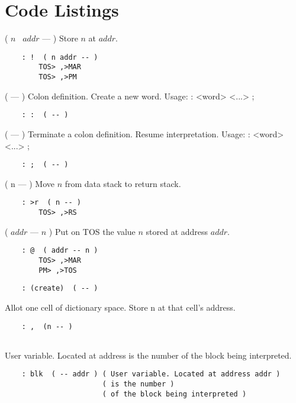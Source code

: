 \setchapterpreamble[u]{\margintoc}
\chapter{Code Listings}

\fixed{\textbf{!}}\hspace{2mm} ( $n$ \ $addr$ --- ) Store $n$ at $addr$.
\begin{lstlisting}
    : !  ( n addr -- )
        TOS> ,>MAR
        TOS> ,>PM
\end{lstlisting}

\fixed{\textbf{:}}\hspace{2mm} ( --- ) Colon definition. Create a new word.
Usage:  : <word> <...> ;
\begin{lstlisting}
    : :  ( -- )
\end{lstlisting}

\fixed{\textbf{;}}\hspace{2mm} ( --- ) Terminate a colon definition. Resume interpretation.
Usage: : <word> <...> ;
\begin{lstlisting}
    : ;  ( -- )
\end{lstlisting}

\hspace{2mm} ( n --- ) Move $n$ from data stack to return stack.
\begin{lstlisting}
    : >r  ( n -- )
        TOS> ,>RS
\end{lstlisting}

\hspace{2mm} ( $addr$ --- $n$ ) Put on TOS the value $n$ stored at address $addr$.
\begin{lstlisting}
    : @  ( addr -- n )
        TOS> ,>MAR
        PM> ,>TOS
\end{lstlisting}

\begin{lstlisting}
    : (create)  ( -- )
\end{lstlisting}

\fixed{\textbf{,}}\hspace{2mm} Allot one cell of dictionary space. Store n at that cell's address.
\begin{lstlisting}
    : ,  (n -- ) 
                 
\end{lstlisting}

\hspace{2mm} User variable. Located at address  is the number
of the block being interpreted.
\begin{lstlisting}
    : blk  ( -- addr ) ( User variable. Located at address addr )
                       ( is the number )
                       ( of the block being interpreted )
\end{lstlisting}

